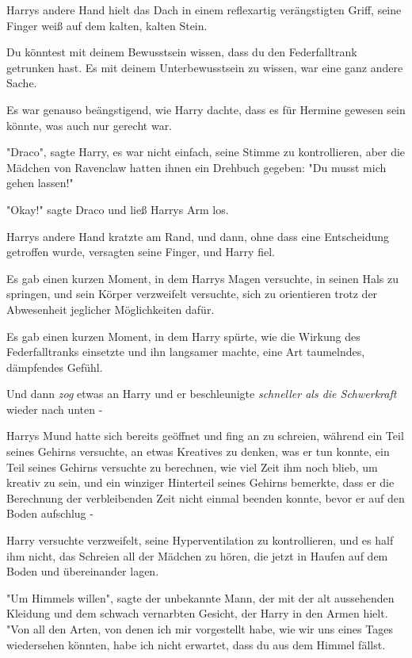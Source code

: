 {Harrys andere Hand hielt das Dach in einem reflexartig verängstigten Griff, seine Finger weiß auf dem kalten, kalten Stein.

Du könntest mit deinem Bewusstsein wissen, dass du den Federfalltrank getrunken hast. Es mit deinem Unterbewusstsein zu wissen, war eine ganz andere Sache.

Es war genauso beängstigend, wie Harry dachte, dass es für Hermine gewesen sein könnte, was auch nur gerecht war.

"Draco", sagte Harry, es war nicht einfach, seine Stimme zu kontrollieren, aber die Mädchen von Ravenclaw hatten ihnen ein Drehbuch gegeben: "Du musst mich gehen lassen!"

"Okay!" sagte Draco und ließ Harrys Arm los.

Harrys andere Hand kratzte am Rand, und dann, ohne dass eine Entscheidung getroffen wurde, versagten seine Finger, und Harry fiel.

Es gab einen kurzen Moment, in dem Harrys Magen versuchte, in seinen Hals zu springen, und sein Körper verzweifelt versuchte, sich zu orientieren trotz der Abwesenheit jeglicher Möglichkeiten dafür.

Es gab einen kurzen Moment, in dem Harry spürte, wie die Wirkung des Federfalltranks einsetzte und ihn langsamer machte, eine Art taumelndes, dämpfendes Gefühl.

Und dann \emph{zog} etwas an Harry und er beschleunigte \emph{schneller als die Schwerkraft} wieder nach unten -

Harrys Mund hatte sich bereits geöffnet und fing an zu schreien, während ein Teil seines Gehirns versuchte, an etwas Kreatives zu denken, was er tun konnte, ein Teil seines Gehirns versuchte zu berechnen, wie viel Zeit ihm noch blieb, um kreativ zu sein, und ein winziger Hinterteil seines Gehirns bemerkte, dass er die Berechnung der verbleibenden Zeit nicht einmal beenden konnte, bevor er auf den Boden aufschlug -

Harry versuchte verzweifelt, seine Hyperventilation zu kontrollieren, und es half ihm nicht, das Schreien all der Mädchen zu hören, die jetzt in Haufen auf dem Boden und übereinander lagen.

"Um Himmels willen", sagte der unbekannte Mann, der mit der alt aussehenden Kleidung und dem schwach vernarbten Gesicht, der Harry in den Armen hielt. "Von all den Arten, von denen ich mir vorgestellt habe, wie wir uns eines Tages wiedersehen könnten, habe ich nicht erwartet, dass du aus dem Himmel fällst.

}
